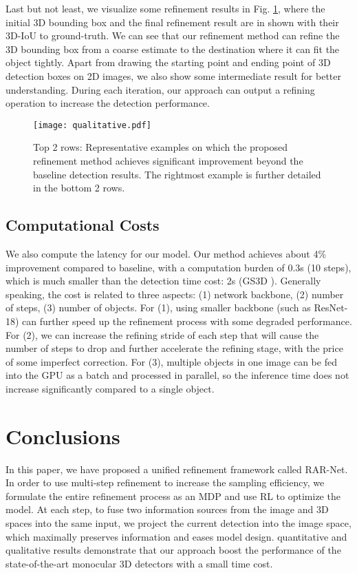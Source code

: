 \documentclass[runningheads]{llncs}
\begin{document}
Last but not least, we visualize some refinement results in Fig. \ref{fig:qualitative}, where the initial 3D bounding box and the final refinement result are in shown with their 3D-IoU to ground-truth. We can see that our refinement method can refine the 3D bounding box from a coarse estimate to the destination where it can fit the object tightly. Apart from drawing the starting point and ending point of 3D detection boxes on 2D images, we also show some intermediate result for better understanding. During each iteration, our approach can output a refining operation to increase the detection performance.

\begin{figure}[t]
\begin{center}
    \begin{center}
       \texttt{[image: qualitative.pdf]}
    \end{center}
\end{center}
   \caption{Top 2 rows: Representative examples on which the proposed refinement method achieves significant improvement beyond the baseline detection results. The rightmost example is further detailed in the bottom 2 rows. }
\label{fig:qualitative}
\end{figure}


\subsection{Computational Costs}
We also compute the latency for our model. Our method achieves about 4\% improvement compared to baseline, with a computation burden of 0.3s (10 steps), which is much smaller than the detection time cost: 2s (GS3D \cite{li2019gs3d}). Generally speaking, the cost is related to three aspects: (1) network backbone, (2) number of steps, (3) number of objects. For (1), using smaller backbone (such as ResNet-18) can further speed up the refinement process with some degraded performance. For (2), we can increase the refining stride of each step that will cause the number of steps to drop and further accelerate the refining stage, with the price of some imperfect correction. For (3), multiple objects in one image can be fed into the GPU as a batch and processed in parallel, so the inference time does not increase significantly compared to a single object. 

\section{Conclusions}
In this paper, we have proposed a unified refinement framework called RAR-Net. In order to use multi-step refinement to increase the sampling efficiency, we formulate the entire refinement process as an MDP and use RL to optimize the model. At each step, to fuse two information sources from the image and 3D spaces into the same input, we project the current detection into the image space, which maximally preserves information and eases model design.  quantitative and qualitative results demonstrate that our approach boost the performance of the state-of-the-art monocular 3D detectors with a small time cost. 
\end{document}
